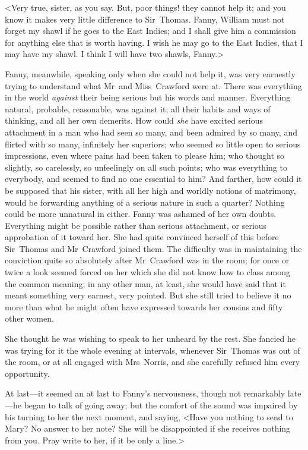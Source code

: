 <Very true, sister, as you say. But, poor things! they cannot help it; and you know it makes very little difference to Sir~Thomas. Fanny, William must not forget my shawl if he goes to the East Indies; and I shall give him a commission for anything else that is worth having. I wish he may go to the East Indies, that I may have my shawl. I think I will have two shawls, Fanny.>

Fanny, meanwhile, speaking only when she could not help it, was very earnestly trying to understand what Mr~and Miss~Crawford were at. There was everything in the world \textit{against}  their being serious but his words and manner. Everything natural, probable, reasonable, was against it; all their habits and ways of thinking, and all her own demerits. How could \textit{she}  have excited serious attachment in a man who had seen so many, and been admired by so many, and flirted with so many, infinitely her superiors; who seemed so little open to serious impressions, even where pains had been taken to please him; who thought so slightly, so carelessly, so unfeelingly on all such points; who was everything to everybody, and seemed to find no one essential to him? And farther, how could it be supposed that his sister, with all her high and worldly notions of matrimony, would be forwarding anything of a serious nature in such a quarter? Nothing could be more unnatural in either. Fanny was ashamed of her own doubts. Everything might be possible rather than serious attachment, or serious approbation of it toward her. She had quite convinced herself of this before Sir~Thomas and Mr~Crawford joined them. The difficulty was in maintaining the conviction quite so absolutely after Mr~Crawford was in the room; for once or twice a look seemed forced on her which she did not know how to class among the common meaning; in any other man, at least, she would have said that it meant something very earnest, very pointed. But she still tried to believe it no more than what he might often have expressed towards her cousins and fifty other women.

She thought he was wishing to speak to her unheard by the rest. She fancied he was trying for it the whole evening at intervals, whenever Sir~Thomas was out of the room, or at all engaged with Mrs~Norris, and she carefully refused him every opportunity.

At last—it seemed an at last to Fanny's nervousness, though not remarkably late—he began to talk of going away; but the comfort of the sound was impaired by his turning to her the next moment, and saying, <Have you nothing to send to Mary? No answer to her note? She will be disappointed if she receives nothing from you. Pray write to her, if it be only a line.>

